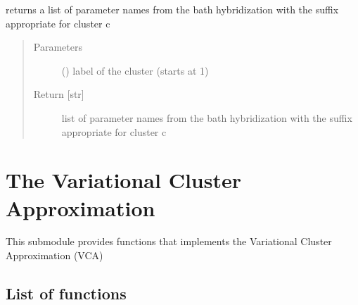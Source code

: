 \documentclass[letterpaper,10pt,english]{sphinxmanual}
\begin{document}
\begin{fulllineitems}
\begin{fulllineitems}
\label{\detokenize{cdmft:pyqcm.cdmft.general_bath.varia_H}}
\sphinxAtStartPar
returns a list of parameter names from the bath hybridization with the suffix appropriate for cluster c
\begin{quote}\begin{description}
\item[{Parameters}] \leavevmode
\sphinxAtStartPar
{} () \textendash{} label of the cluster (starts at 1)

\item[{Return {[}str{]}}] \leavevmode
\sphinxAtStartPar
list of parameter names from the bath hybridization with the suffix appropriate for cluster c

\end{description}\end{quote}

\end{fulllineitems}


\end{fulllineitems}



\chapter{The Variational Cluster Approximation}
\label{\detokenize{vca:the-variational-cluster-approximation}}\label{\detokenize{vca::doc}}
\sphinxAtStartPar
This submodule provides functions that implements the Variational Cluster Approximation (VCA)


\section{List of functions}
\label{\detokenize{vca:module-pyqcm.vca}}\label{\detokenize{vca:list-of-functions}}
\end{document}
